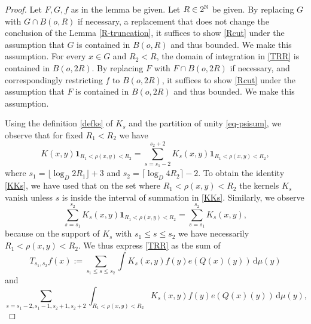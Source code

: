 \begin{proof}
\leanok
Let $F,G,f$ as in the lemma be given. Let $R\in 2^{\mathbb{N}}$ be given.
By replacing $G$ with $G\cap B(o,R)$ if necessary, a replacement that does not change the conclusion of the Lemma \ref{R-truncation}, it suffices to show \eqref{Rcut} under the assumption that $G$ is contained in $B(o,R)$ and thus bounded. We make this assumption. For every $x\in G$ and $R_2 < R$, the domain of integration in \eqref{TRR} is contained in $B(o,2R)$. By replacing $F$ with $F\cap B(o,2R)$ if necessary, and correspondingly restricting $f$ to $B(o, 2R)$, it suffices to show \eqref{Rcut} under the assumption that $F$ is contained in $B(o,2R)$ and thus bounded. We make this assumption.

Using the definition \eqref{defks} of $K_s$ and the partition of unity \eqref{eq-psisum},
we observe that
for fixed $R_1<R_2$ we have
\begin{equation}
    \label{KKs}
    K(x,y)\mathbf{1}_{R_1<\rho(x,y)<R_2}=\sum_{s=s_1-2}^{s_2+2} K_s(x,y) \mathbf{1}_{R_1<\rho(x,y)<R_2},
\end{equation}
where $s_1=\lfloor\log_D 2R_1\rfloor+3$ and $s_2=\lceil\log_D 4R_2\rceil-2$.
To obtain the identity \eqref{KKs}, we have used that on the set where $R_1<\rho(x,y)<R_2$ the kernels $K_s$ vanish unless $s$ is inside the interval of summation in \eqref{KKs}. Similarly, we observe
\begin{equation}
    \label{KsrhoKs}
    \sum_{s=s_1}^{s_2} K_s(x,y) \mathbf{1}_{R_1<\rho(x,y)<R_2} = \sum_{s=s_1}^{s_2} K_s(x,y),
\end{equation}
because on the support of $K_s$ with $s_1\le s\le s_2$ we have necessarily $R_1<\rho(x,y)<R_2$. We thus express \eqref{TRR} as the sum of
\begin{equation}\label{middles}
T_{s_1,s_2}f(x):=\sum_{s_1 \le s\le s_2}
\int K_s(x,y) f(y) e(Q(x)(y)) \, \mathrm{d}\mu(y)
\end{equation}
and
\begin{equation}\label{boundarys}
\sum_{s=s_1-2,s_1-1, s_2+1, s_2+2}
\int_{R_1 < \rho(x,y) < R_2} K_s(x,y) f(y) e(Q(x)(y)) \,
 \mathrm{d}\mu(y),
\end{equation}


\end{proof}
